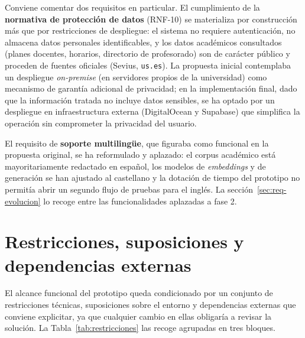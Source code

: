 Conviene comentar dos requisitos en particular. El cumplimiento de la \textbf{normativa de protección de datos} (RNF-10) se materializa por construcción más que por restricciones de despliegue: el sistema no requiere autenticación, no almacena datos personales identificables, y los datos académicos consultados (planes docentes, horarios, directorio de profesorado) son de carácter público y proceden de fuentes oficiales (Sevius, \texttt{us.es}). La propuesta inicial contemplaba un despliegue \textit{on-premise} (en servidores propios de la universidad) como mecanismo de garantía adicional de privacidad; en la implementación final, dado que la información tratada no incluye datos sensibles, se ha optado por un despliegue en infraestructura externa (DigitalOcean y Supabase) que simplifica la operación sin comprometer la privacidad del usuario.

El requisito de \textbf{soporte multilingüe}, que figuraba como funcional en la propuesta original, se ha reformulado y aplazado: el corpus académico está mayoritariamente redactado en español, los modelos de \textit{embeddings} y de generación se han ajustado al castellano y la dotación de tiempo del prototipo no permitía abrir un segundo flujo de pruebas para el inglés. La sección~\ref{sec:req-evolucion} lo recoge entre las funcionalidades aplazadas a fase 2.

\section{Restricciones, suposiciones y dependencias externas}\label{sec:req-restricciones}

El alcance funcional del prototipo queda condicionado por un conjunto de restricciones técnicas, suposiciones sobre el entorno y dependencias externas que conviene explicitar, ya que cualquier cambio en ellas obligaría a revisar la solución. La Tabla~\ref{tab:restricciones} las recoge agrupadas en tres bloques.

